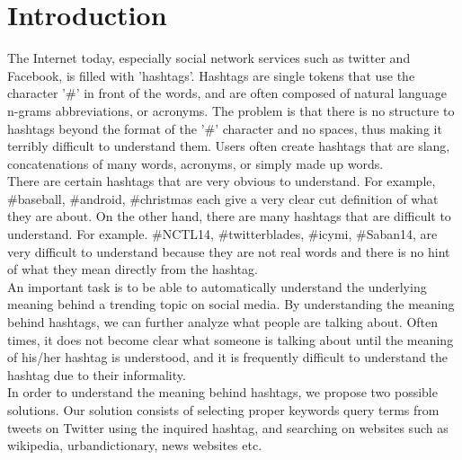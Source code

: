 \documentclass{sig-alternate}
\begin{document}
\section{Introduction}
The Internet today, especially social network services such as twitter and Facebook, is filled with 'hashtags'. Hashtags are single tokens that use the character '\#' in front of the words, and are often composed of natural language n-grams abbreviations, or acronyms. The problem is that there is no structure to hashtags beyond the format of the '\#' character and no spaces, thus making it terribly difficult to understand them. Users often create hashtags that are slang, concatenations of many words, acronyms, or simply made up words.  \\
There are certain hashtags that are very obvious to understand. For example, \#baseball, \#android, \#christmas each give a very clear cut definition of what they are about. On the other hand, there are many hashtags that are difficult to understand. For example. \#NCTL14, \#twitterblades, \#icymi, \#Saban14, are very difficult to understand because they are not real words and there is no hint of what they mean directly from the hashtag.\\
An important task is to be able to automatically understand the underlying meaning behind a trending topic on social media. By understanding the meaning behind hashtags, we can further analyze what people are talking about. Often times, it does not become clear what someone is talking about until the meaning of his/her hashtag is understood, and it is frequently difficult to understand the hashtag due to their informality.\\
In order to understand the meaning behind hashtags, we propose two possible solutions. Our solution consists of selecting proper keywords query terms from tweets on Twitter using the inquired hashtag, and searching on websites such as wikipedia, urbandictionary, news websites etc.
\\
\end{document}
